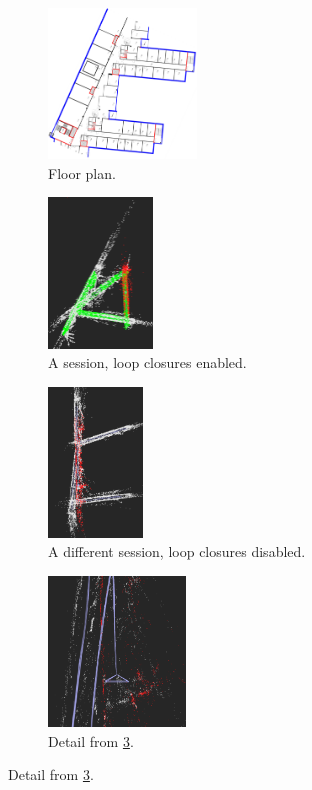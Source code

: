 \documentclass[11pt, letterpaper, twoside]{article}
\begin{document}
\begin{figure}[tb]
    \begin{subfigure}[t]{.24\textwidth}
        \centering
        \includegraphics[height=4cm]{corridor_rot.png}
        \caption{Floor plan.}\label{fig:openvslam_tietotalo_corridor}
    \end{subfigure}%
    \begin{subfigure}[t]{.24\textwidth}
        \centering
        \includegraphics[height=4cm]{openvslam_tietotalo_with_lc.png}
        \caption{A session, loop closures enabled.}\label{fig:openvslam_tietotalo_with_lc}
    \end{subfigure}%
    \begin{subfigure}[t]{.24\textwidth}
        \centering
        \includegraphics[height=4cm]{openvslam_tietotalo_without_lc}
        \caption{A different session, loop closures disabled.}\label{fig:openvslam_tietotalo_without_lc}
    \end{subfigure}%
    \begin{subfigure}[t]{.24\textwidth}
        \centering
        \includegraphics[height=4cm]{openvslam_tietotalo_without_lc_detail}
        \caption{Detail from \cref{fig:openvslam_tietotalo_without_lc}.}\label{fig:openvslam_tietotalo_without_lc_detail}
    \end{subfigure}%


\end{figure}
\end{document}
